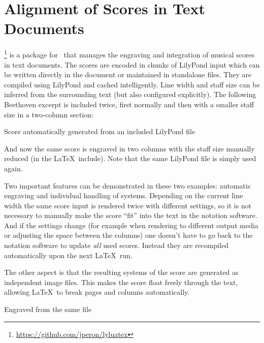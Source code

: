\documentclass[DIV=12]{scrartcl}
\begin{document}
\section*{Alignment of Scores in Text Documents}

\lyluatex%
\footnote{\url{https://github.com/jperon/lyluatex}}
 is a package for \LuaLaTeX\ that manages the engraving and integration of musical scores in text documents. The scores are encoded in chunks of LilyPond input which can be written directly in the document or maintained in standalone files.  They are compiled using LilyPond and cached intelligently. Line width and staff size can be inferred from the surrounding text (but also configured explicitly). The following Beethoven excerpt is included twice, first normally and then with a smaller staff size in a two-column section:

\begin{musicExampleNonFloat}
\caption{Score automatically generated from an included LilyPond file}
\end{musicExampleNonFloat}

\setlength{\columnsep}{1cm}
\begin{multicols}{2}

And now the same score is engraved in two columns with the staff size manually reduced (in the \LaTeX\ include).  Note that the same LilyPond file is simply used again.

Two important features can be demonstrated in these two examples: automatic engraving and individual handling of systems.  Depending on the current line width the same score input is rendered twice with different settings, so it is not necessary to manually make the score “fit” into the text in the notation software. And if the settings change (for example when rendering to different output media or adjusting the space between the columns) one doesn't have to go back to the notation software to update \emph{all} used scores. Instead they are recompiled automatically upon the next \LaTeX\ run.

The other aspect is that the resulting systems of the score are generated as independent image files. This makes the score float freely through the text, allowing \LaTeX\ to break pages and columns automatically.

\begin{musicExampleNonFloat}
\caption{Engraved from the same file}
\end{musicExampleNonFloat}
\end{multicols}
\end{document}

